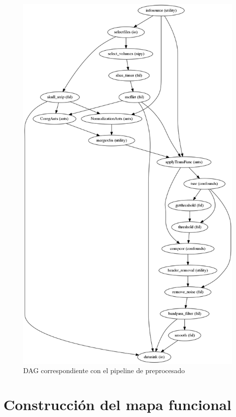 \begin{figure}[H]
	\includegraphics[width=\linewidth, height=\textheight, keepaspectratio]{img/preproc/graph.png}
	\caption{DAG correspondiente con el pipeline de preprocesado}
	\label{preproc:pipeline}
\end{figure}
\section{Construcción del mapa funcional}

